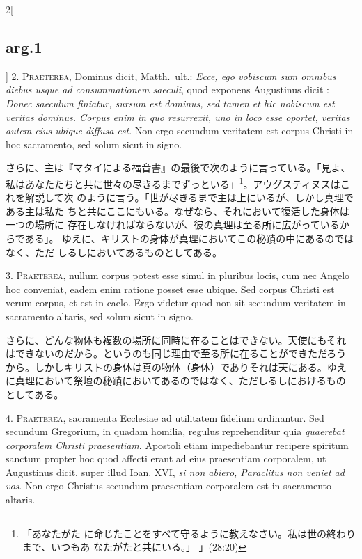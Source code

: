 \documentclass[paper=a4paper,fontsize=10pt,jafontsize=9pt,titlepage]{jlreq}
\begin{document}
\begin{paracol}{2}[\subsection{arg.1}]
2. {\scshape Praeterea}, Dominus dicit, Matth.~ult.: {\itshape Ecce,
ego vobiscum sum omnibus diebus usque ad consummationem saeculi}, quod
exponens Augustinus dicit : {\itshape Donec saeculum finiatur, sursum
est dominus, sed tamen et hic nobiscum est veritas dominus. Corpus
enim in quo resurrexit, uno in loco esse oportet, veritas autem eius
ubique diffusa est}. Non ergo secundum veritatem est corpus Christi in
hoc sacramento, sed solum sicut in signo.

\switchcolumn

さらに、主は『マタイによる福音書』の最後で次のように言っている。「見よ、
私はあなたたちと共に世々の尽きるまでずっといる」\footnote{「あなたがた
に命じたことをすべて守るように教えなさい。私は世の終わりまで、いつもあ
なたがたと共にいる。」 」(28:20)}。アウグスティヌスはこれを解説して次
のように言う。「世が尽きるまで主は上にいるが、しかし真理である主は私た
ちと共にここにもいる。なぜなら、それにおいて復活した身体は一つの場所に
存在しなければならないが、彼の真理は至る所に広がっているからである」。
ゆえに、キリストの身体が真理においてこの秘蹟の中にあるのではなく、ただ
しるしにおいてあるものとしてある。


3. {\scshape Praeterea}, nullum corpus potest esse simul in pluribus
locis, cum nec Angelo hoc conveniat, eadem enim ratione posset esse
ubique. Sed corpus Christi est verum corpus, et est in caelo. Ergo
videtur quod non sit secundum veritatem in sacramento altaris, sed
solum sicut in signo.

\switchcolumn

さらに、どんな物体も複数の場所に同時に在ることはできない。天使にもそれ
はできないのだから。というのも同じ理由で至る所に在ることができただろう
から。しかしキリストの身体は真の物体（身体）でありそれは天にある。ゆえ
に真理において祭壇の秘蹟においてあるのではなく、ただしるしにおけるもの
としてある。


4. {\scshape Praeterea}, sacramenta Ecclesiae ad utilitatem fidelium
ordinantur. Sed secundum Gregorium, in quadam homilia, regulus
reprehenditur quia {\itshape quaerebat corporalem Christi
praesentiam}. Apostoli etiam impediebantur recipere spiritum sanctum
propter hoc quod affecti erant ad eius praesentiam corporalem, ut
Augustinus dicit, super illud Ioan. XVI, {\itshape si non abiero,
Paraclitus non veniet ad vos}. Non ergo Christus secundum praesentiam
corporalem est in sacramento altaris.


\end{paracol}
\end{document}
